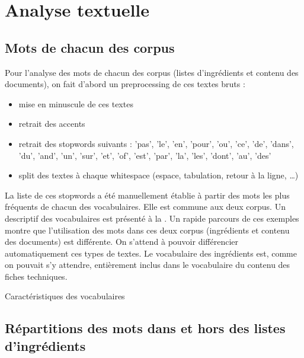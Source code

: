         
    \chapter{Analyse textuelle}

        \section{Mots de chacun des corpus}

        Pour l'analyse des mots de chacun des corpus (listes d'ingrédients et contenu des documents), on fait d'abord un preprocessing de ces textes bruts :
        \begin{itemize}
            \item mise en minuscule de ces textes
            \item retrait des accents
            \item retrait des stopwords suivants : {'pas', 'le', 'en', 'pour', 'ou', 'ce', 'de', 'dans', 'du', 'and', 'un', 'sur', 'et', 'of', 'est', 'par', 'la', 'les', 'dont', 'au', 'des'}
            \item split des textes à chaque whitespace (espace, tabulation, retour à la ligne, \dots)
        \end{itemize}
        La liste de ces stopwords a été manuellement établie à partir des mots les plus fréquents de chacun des vocabulaires.
        Elle est commune aux deux corpus.
        Un descriptif des vocabulaires est présenté à la .
        Un rapide parcours de ces exemples montre que l'utilisation des mots dans ces deux corpus (ingrédients et contenu des documents) est différente.
        On s'attend à pouvoir différencier automatiquement ces types de textes.
        Le vocabulaire des ingrédients est, comme on pouvait s'y attendre, entièrement inclus dans le vocabulaire du contenu des fiches techniques.
        
        {\renewcommand{\arraystretch}{1.5}%
        \begin{table}[htbp]
            \begin{center}
            {\scriptsize
            
            }
            \caption{Caractéristiques des vocabulaires}
            \label{tbl:vocabularies}
            \end{center}
        \end{table}
        }

        \section{Répartitions des mots dans et hors des listes d'ingrédients}

